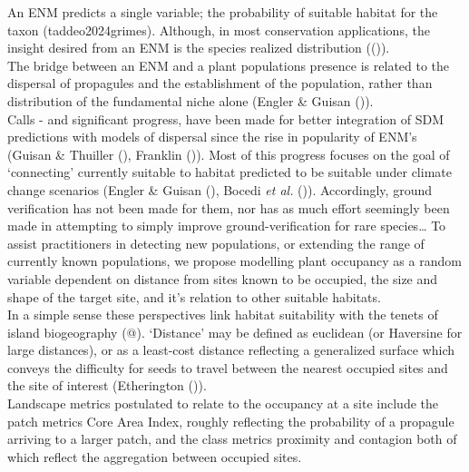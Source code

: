 \documentclass[
]{article}
\begin{document}
An ENM predicts a single variable; the probability of suitable habitat
for the taxon (taddeo2024grimes). Although, in most conservation
applications, the insight desired from an ENM is the species realized
distribution (()).\\
The bridge between an ENM and a plant populations presence is related to
the dispersal of propagules and the establishment of the population,
rather than distribution of the fundamental niche alone (Engler \&
Guisan ()).\\
Calls - and significant progress, have been made for better integration
of SDM predictions with models of dispersal since the rise in popularity
of ENM's (Guisan \& Thuiller
(), Franklin
()). Most of this progress
focuses on the goal of `connecting' currently suitable to habitat
predicted to be suitable under climate change scenarios (Engler \&
Guisan (), Bocedi \emph{et al.}
()). Accordingly, ground
verification has not been made for them, nor has as much effort
seemingly been made in attempting to simply improve ground-verification
for rare species\ldots{} To assist practitioners in detecting new
populations, or extending the range of currently known populations, we
propose modelling plant occupancy as a random variable dependent on
distance from sites known to be occupied, the size and shape of the
target site, and it's relation to other suitable habitats.\\
In a simple sense these perspectives link habitat suitability with the
tenets of island biogeography (@). `Distance' may be defined as
euclidean (or Haversine for large distances), or as a least-cost
distance reflecting a generalized surface which conveys the difficulty
for seeds to travel between the nearest occupied sites and the site of
interest (Etherington ()).\\
Landscape metrics postulated to relate to the occupancy at a site
include the patch metrics Core Area Index, roughly reflecting the
probability of a propagule arriving to a larger patch, and the class
metrics proximity and contagion both of which reflect the aggregation
between occupied sites.
\end{document}
